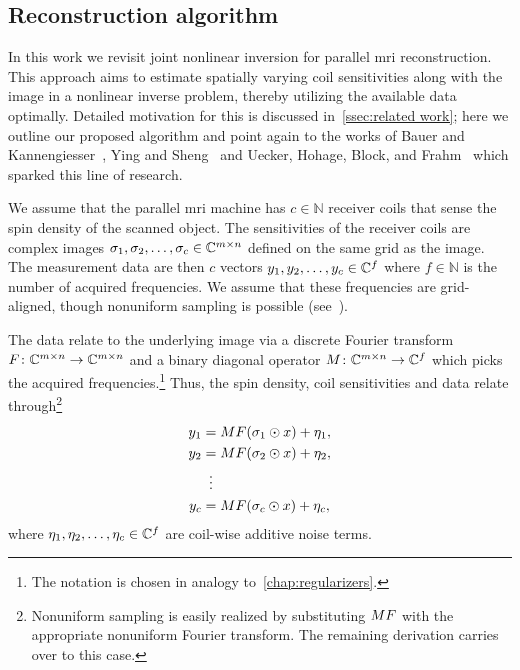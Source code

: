 \subsection{Reconstruction algorithm}%
\label{ssec:mri}
In this work we revisit joint nonlinear inversion for parallel \gls{mri} reconstruction.
This approach aims to estimate spatially varying coil sensitivities along with the image in a nonlinear inverse problem, thereby utilizing the available data optimally.
Detailed motivation for this is discussed in~\cref{ssec:related work};
here we outline our proposed algorithm and point again to the works of Bauer and Kannengiesser~\cite{bauer_efficient_2007}, Ying and Sheng~\cite{Ying2007} and Uecker, Hohage, Block, and Frahm~\cite{uecker_image_2008} which sparked this line of research.

We assume that the parallel \gls{mri} machine has \( c \in \mathbb{N} \) receiver coils that sense the spin density of the scanned object.
The sensitivities of the receiver coils are complex images \( \sigma_{\num{1}}, \sigma_{\num{2}}, \dotsc, \sigma_c \in \mathbb{C}^{m \times n} \) defined on the same grid as the image.
The measurement data are then \( c \) vectors \( y_{\num{1}}, y_{\num{2}}, \dotsc, y_c \in \mathbb{C}^f \) where \( f \in \mathbb{N} \) is the number of acquired frequencies.
We assume that these frequencies are grid-aligned, though nonuniform sampling is possible (see~\cite{Smith2018}).

The data relate to the underlying image via a discrete Fourier transform \( F \colon \mathbb{C}^{m \times n} \to \mathbb{C}^{m\times n} \) and a binary diagonal operator \( M \colon \mathbb{C}^{m \times n} \to \mathbb{C}^f \) which picks the acquired frequencies.\footnote{
	The notation is chosen in analogy to~\cref{chap:regularizers}.
}
Thus, the spin density, coil sensitivities and data relate through\footnote{%
	Nonuniform sampling is easily realized by substituting \( MF \) with the appropriate nonuniform Fourier transform.
	The remaining derivation carries over to this case.
}
\begin{equation}
	\begin{aligned}
		\Data_{\num{1}} &= \Mask\Fourier(\sigma_{\num{1}} \odot x) + \eta_{\num{1}},\\
		\Data_{\num{2}} &= \Mask\Fourier(\sigma_{\num{2}} \odot x) + \eta_{\num{2}},\\
			&\vdotswithin{=} \\
		\Data_c &= \Mask\Fourier(\sigma_c \odot x) + \eta_c,
	\end{aligned}
	\label{eq:data for parallel imaging}
\end{equation}
where \( \eta_{\num{1}}, \eta_{\num{2}}, \dotsc, \eta_c \in \mathbb{C}^f \) are coil-wise additive noise terms.

